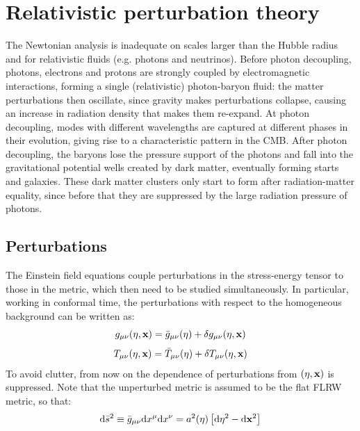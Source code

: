 \newpage
\section{Relativistic perturbation theory}

The Newtonian analysis is inadequate on scales larger than the Hubble radius and for relativistic fluids (e.g. photons and neutrinos). Before photon decoupling, photons, electrons and protons are strongly coupled by electromagnetic interactions, forming a single (relativistic) photon-baryon fluid: the matter perturbations then oscillate, since gravity makes perturbations collapse, causing an increase in radiation density that makes them re-expand. At photon decoupling, modes with different wavelengths are captured at different phases in their evolution, giving rise to a characteristic pattern in the CMB. After photon decoupling, the baryons lose the pressure support of the photons and fall into the gravitational potential wells created by dark matter, eventually forming starts and galaxies. These dark matter clusters only start to form after radiation-matter equality, since before that they are suppressed by the large radiation pressure of photons.

\subsection{Perturbations}

The Einstein field equations  couple perturbations in the stress-energy tensor to those in the metric, which then need to be studied simultaneously. In particular, working in conformal time, the perturbations with respect to the homogeneous background can be written as:
\begin{equation}
  g_{\mu \nu}(\eta , \mathbf{x}) = \bar g_{\mu \nu}(\eta) + \delta g_{\mu \nu}(\eta , \mathbf{x})
\end{equation}
\begin{equation}
  T_{\mu \nu}(\eta , \mathbf{x}) = \bar T_{\mu \nu}(\eta) + \delta T_{\mu \nu}(\eta , \mathbf{x})
\end{equation}
To avoid clutter, from now on the dependence of perturbations from $ (\eta , \mathbf{x}) $ is suppressed. Note that the unperturbed metric is assumed to be the flat FLRW metric, so that:
\begin{equation*}
  \mathrm{d} \bar s^2 \equiv \bar g_{\mu \nu} \mathrm{d} x^\mu \mathrm{d} x^\nu = a^2(\eta) \left[ \mathrm{d} \eta^2 - \mathrm{d} \mathbf{x}^2 \right]
\end{equation*}

